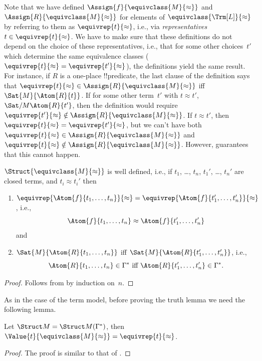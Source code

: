 \documentclass[../../../include/open-logic-section]{subfiles}
\begin{document}
\begin{explain}
Note that we have defined $\Assign{f}{\equivclass{M}{\approx}}$ and
$\Assign{R}{\equivclass{M}{\approx}}$ for elements of
$\equivclass{\Trm[L]}{\approx}$ by referring to them as
$\equivrep{t}{\approx}$, i.e., via \emph{representatives}~$t \in
\equivrep{t}{\approx}$.  We have to make sure that these definitions
do not depend on the choice of these representatives, i.e., that for
some other choices~$t'$ which determine the same equivalence classes
($\equivrep{t}{\approx} = \equivrep{t'}{\approx}$), the definitions
yield the same result. For instance, if $R$ is a one-place
!!{predicate}, the last clause of the definition says that
$\equivrep{t}{\approx} \in \Assign{R}{\equivclass{M}{\approx}}$ iff
$\Sat{M}{\Atom{R}{t}}$. If for some other term~$t'$ with $t \approx
t'$, $\Sat/{M}{\Atom{R}{t'}}$, then the definition would require
$\equivrep{t'}{\approx} \notin \Assign{R}{\equivclass{M}{\approx}}$.
If $t \approx t'$, then $\equivrep{t}{\approx} =
\equivrep{t'}{\approx}$, but we can't have both $\equivrep{t}{\approx}
\in \Assign{R}{\equivclass{M}{\approx}}$ and $\equivrep{t}{\approx}
\notin \Assign{R}{\equivclass{M}{\approx}}$.  However,
 guarantees that this cannot happen.
\end{explain}

\begin{prop}
$\Struct{\equivclass{M}{\approx}}$ is well defined, i.e., if $t_1$,
  \dots, $t_n$, $t_1'$, \dots, $t_n'$ are closed terms,
  and $t_i \approx t_i'$ then
\begin{enumerate}
\item $\equivrep{\Atom{f}{t_1,\dots, t_n}}{\approx} =
    \equivrep{\Atom{f}{t_1',\dots, t_n'}}{\approx}$, i.e.,
  \[
  \Atom{f}{t_1,\dots, t_n} \approx \Atom{f}{t_1',\dots, t_n'}
  \]
  and
\item $\Sat{M}{\Atom{R}{t_1,\dots, t_n}}$ iff
  $\Sat{M}{\Atom{R}{t_1',\dots, t_n'}}$, i.e.,
  \[
    \Atom{R}{t_1,\dots, t_n} \in \Gamma^* \text{ iff }
    \Atom{R}{t_1',\dots, t_n'} \in \Gamma^*.
  \]
\end{enumerate}
\end{prop}

\begin{proof}
Follows from  by induction on~$n$.
\end{proof}

As in the case of the term model, before proving the truth lemma we need the
following lemma.

\begin{lem} 
 Let $\Struct M = \Struct M
 (\Gamma^*)$, then $\Value{t}{\equivclass{M}{\approx}} = \equivrep{t}
 {\approx}$.
\end{lem}
\begin{proof} 
The proof is similar to that of .
\end{proof}
\end{document}
